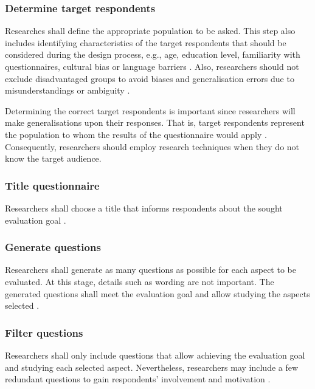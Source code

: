 \subsubsection{Determine target respondents}
Researches shall define the appropriate population to be asked. This step also includes identifying characteristics of the target respondents that should be considered during the design process, e.g., age, education level, familiarity with questionnaires, cultural bias or language barriers \autocite{Diem,Crawford1997}. Also, researchers should not exclude disadvantaged groups to avoid biases and generalisation errors due to misunderstandings or ambiguity \autocite{Boynton2004b}.

Determining the correct target respondents is important since researchers will make generalisations upon their responses. That is, target respondents represent the population to whom the results of the questionnaire would apply \autocite{Crawford1997,Diem}. Consequently, researchers should employ research techniques when they do not know the target audience.

\subsubsection{Title questionnaire}
Researchers shall choose a title that informs respondents about the sought evaluation goal \autocite{Diem}.

\subsubsection{Generate questions}
Researchers shall generate as many questions as possible for each aspect to be evaluated. At this stage, details such as wording are not important. The generated questions shall meet the evaluation goal and allow studying the aspects selected \autocite{Crawford1997,Radhakrishna2007}.

\subsubsection{Filter questions}
Researchers shall only include questions that allow achieving the evaluation goal and studying each selected aspect. Nevertheless, researchers may include a few redundant questions to gain respondents' involvement and motivation \autocite{Crawford1997}.

